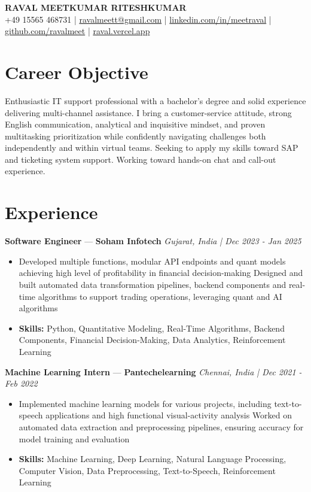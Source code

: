 \documentclass[a4paper,10pt]{article}
\begin{document}
\begin{center}
  {\Large\bfseries RAVAL MEETKUMAR RITESHKUMAR}\\[2pt]
  {\small +49 15565 468731 \;|\; \href{mailto:ravalmeett@gmail.com}{ravalmeett@gmail.com} \;|\; \href{https://www.linkedin.com/in/meetraval/}{linkedin.com/in/meetraval} \;|\; \href{https://github.com/ravalmeet}{github.com/ravalmeet} \;|\; \href{https://raval.vercel.app/}{raval.vercel.app}}
\end{center}
\vspace{-3pt}

\section*{Career Objective}
Enthusiastic IT support professional with a bachelor's degree and solid experience delivering multi-channel assistance. I bring a customer-service attitude, strong English communication, analytical and inquisitive mindset, and proven multitasking prioritization while confidently navigating challenges both independently and within virtual teams. Seeking to apply my skills toward SAP and ticketing system support. Working toward hands-on chat and call-out experience.\par

\section*{Experience}
\textbf{Software Engineer} — \textbf{Soham Infotech} \hfill \textit{Gujarat, India \;|\; Dec 2023 - Jan 2025}\par
\vspace{1pt}
\begin{itemize}
  \item Developed multiple functions, modular API endpoints and quant models achieving high level of profitability in financial decision-making Designed and built automated data transformation pipelines, backend components and real-time algorithms to support trading operations, leveraging quant and AI algorithms
  \item \textbf{Skills:} Python, Quantitative Modeling, Real-Time Algorithms, Backend Components, Financial Decision-Making, Data Analytics, Reinforcement Learning
\end{itemize}
\vspace{3pt}
\textbf{Machine Learning Intern} — \textbf{Pantechelearning} \hfill \textit{Chennai, India \;|\; Dec 2021 - Feb 2022}\par
\vspace{1pt}
\begin{itemize}
  \item Implemented machine learning models for various projects, including text-to-speech applications and high functional visual-activity analysis Worked on automated data extraction and preprocessing pipelines, ensuring accuracy for model training and evaluation
  \item \textbf{Skills:} Machine Learning, Deep Learning, Natural Language Processing, Computer Vision, Data Preprocessing, Text-to-Speech, Reinforcement Learning
\end{itemize}
\end{document}
